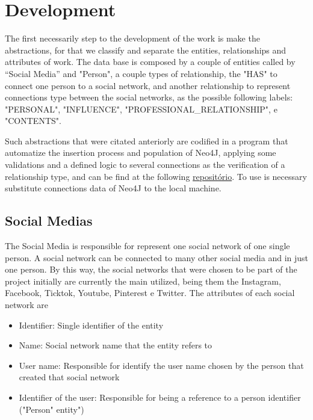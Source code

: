 \chapter{Development}
The first necessarily step to the development of the work is make the abstractions, for that we classify and separate the entities, relationships and attributes of work. The data base is composed by a couple of entities called by “Social Media” and "Person", a couple types of relationship, the "HAS" to connect one person to a social network, and another relationship to represent connections type between the social networks, as the possible following labels: "PERSONAL", "INFLUENCE", "PROFESSIONAL\_RELATIONSHIP", e "CONTENTS".

Such abstractions that were citated anteriorly are codified in a program that automatize the insertion process and population of Neo4J, applying some validations and a defined logic to several connections as the verification of a relationship type, and can be find at the following \href{https://github.com/LeonardoLeiteMeira/process_CSV_to_graph_database}{repositório}. To use is necessary substitute connections data of Neo4J to the local machine.



\section{Social Medias}

The Social Media is responsible for represent one social network of one single person. A social network can be connected to many other social media and in just one person. By this way, the social networks that were chosen to be part of the project initially are currently the main utilized, being them the Instagram, Facebook, Ticktok, Youtube, Pinterest e Twitter.
The attributes of each social network are

\begin{itemize}

\item Identifier: Single identifier of the entity

\item Name: Social network name that the entity refers to 

\item User name: Responsible for identify the user name chosen by 
the person that created that social network

\item Identifier of the user: Responsible for being a reference to a person identifier ("Person" entity")

\end{itemize}




